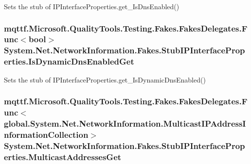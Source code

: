 Sets the stub of I\-P\-Interface\-Properties.\-get\-\_\-\-Is\-Dns\-Enabled()

\hypertarget{class_system_1_1_net_1_1_network_information_1_1_fakes_1_1_stub_i_p_interface_properties_a7438cfa37aea5d2a247ead5c18cb9f35}{
\subsubsection[{Is\-Dynamic\-Dns\-Enabled\-Get}]{\setlength{\rightskip}{0pt plus 5cm}mqttf.\-Microsoft.\-Quality\-Tools.\-Testing.\-Fakes.\-Fakes\-Delegates.\-Func$<$bool$>$ System.\-Net.\-Network\-Information.\-Fakes.\-Stub\-I\-P\-Interface\-Properties.\-Is\-Dynamic\-Dns\-Enabled\-Get}}\label{class_system_1_1_net_1_1_network_information_1_1_fakes_1_1_stub_i_p_interface_properties_a7438cfa37aea5d2a247ead5c18cb9f35}


Sets the stub of I\-P\-Interface\-Properties.\-get\-\_\-\-Is\-Dynamic\-Dns\-Enabled()

\hypertarget{class_system_1_1_net_1_1_network_information_1_1_fakes_1_1_stub_i_p_interface_properties_af5819a07df6522dc9fac5e0f7938f47f}{
\subsubsection[{Multicast\-Addresses\-Get}]{\setlength{\rightskip}{0pt plus 5cm}mqttf.\-Microsoft.\-Quality\-Tools.\-Testing.\-Fakes.\-Fakes\-Delegates.\-Func$<$global.\-System.\-Net.\-Network\-Information.\-Multicast\-I\-P\-Address\-Information\-Collection$>$ System.\-Net.\-Network\-Information.\-Fakes.\-Stub\-I\-P\-Interface\-Properties.\-Multicast\-Addresses\-Get}}\label{class_system_1_1_net_1_1_network_information_1_1_fakes_1_1_stub_i_p_interface_properties_af5819a07df6522dc9fac5e0f7938f47f}


